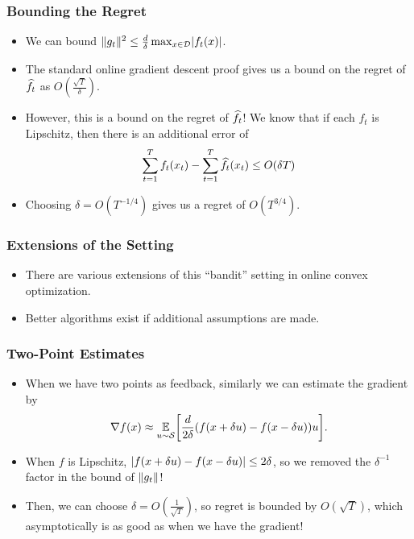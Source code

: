 \documentclass{beamer}
\begin{document}
\begin{frame}
    \frametitle{Bounding the Regret}
    \begin{itemize}
        \item We can bound $\lVert g_t\rVert^2 \le \frac{d}{\delta} \max_{x \in \mathcal{D}} \lvert f_t(x)\rvert$.
        \item The standard online gradient descent proof gives us a bound on the regret of $\widehat{f}_t$ as $O(\frac{\sqrt{T}}{\delta})$.
        \item However, this is a bound on the regret of $\widehat{f}_t$! We know that if each $f_t$ is Lipschitz, then there is an additional error of
        \[
            \sum_{t=1}^T f_t(x_t) - \sum_{t=1}^T \widehat{f}_t(x_t) \le O(\delta T)
        \]
        \item Choosing $\delta = O(T^{-1/4})$ gives us a regret of $O(T^{3/4})$.
    \end{itemize}
\end{frame}

\begin{frame}
    \frametitle{Extensions of the Setting}
    \begin{itemize}
        \item There are various extensions of this ``bandit'' setting in online convex optimization.
        \item Better algorithms exist if additional assumptions are made.
    \end{itemize}
\end{frame}

\begin{frame}
    \frametitle{Two-Point Estimates~\citep{agarwal2010optimal}}
    \begin{itemize}
        \item When we have two points as feedback, similarly we can estimate the gradient by
        \[
            \nabla f(x) \approx \E_{u \sim \Sc} \bracks*{\frac{d}{2\delta}(f(x + \delta u) - f(x - \delta u)) u}.
        \]
        \item When $f$ is Lipschitz, $\lvert f(x + \delta u) - f(x - \delta u)\rvert \le 2\delta$, so we removed the $\delta^{-1}$ factor in the bound of $\lVert g_t\rVert$!
        \item Then, we can choose $\delta = O(\frac{1}{\sqrt{T}})$, so regret is bounded by $O(\sqrt{T})$, which asymptotically is as good as when we have the gradient!
    \end{itemize}
\end{frame}
\end{document}
